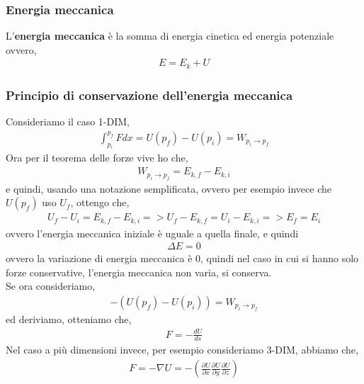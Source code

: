         \subsubsection{Energia meccanica}
            L'\textbf{energia meccanica} è la somma di energia cinetica ed energia potenziale ovvero,
            \begin{align*}
                E=E_k+U
            \end{align*}

        \subsubsection{Principio di conservazione dell'energia meccanica}
            Consideriamo il caso 1-DIM,
            \begin{align*}
                \int_{p_i}^{p_f} F dx = U(p_f) - U(p_i) = W_{p_i\rightarrow p_f}
            \end{align*}
            Ora per il teorema delle forze vive ho che,
            \begin{align*}
                W_{p_i\rightarrow p_f}=E_{k,f} - E_{k,i}
            \end{align*}
            e quindi, usando una notazione semplificata, ovvero per esempio invece che $U(p_f)$ uso $U_f$, ottengo che,
            \begin{align*}
                U_f - U_i=E_{k,f} - E_{k,i} => U_f - E_{k,f}=U_i - E_{k,i} => E_f = E_i
            \end{align*}
            ovvero l'energia meccanica iniziale è uguale a quella finale, e quindi
            \begin{align*}
                \Delta E = 0
            \end{align*}
            ovvero la variazione di energia meccanica è $0$, quindi nel caso in cui si hanno solo forze conservative, l'energia meccanica non varia, si conserva.\\
            Se ora consideriamo,
            \begin{align*}
                -(U(p_f) - U(p_i)) = W_{p_i\rightarrow p_f}
            \end{align*}
            ed deriviamo, otteniamo che,
            \begin{align*}
                F=- \frac{dU}{ds}
            \end{align*}
            Nel caso a più dimensioni invece, per esempio consideriamo 3-DIM, abbiamo che,
            \begin{align*}
                F=- \nabla U =-(\frac{\partial U}{\partial x}\frac{\partial U}{\partial y}\frac{\partial U}{\partial z})
            \end{align*}

